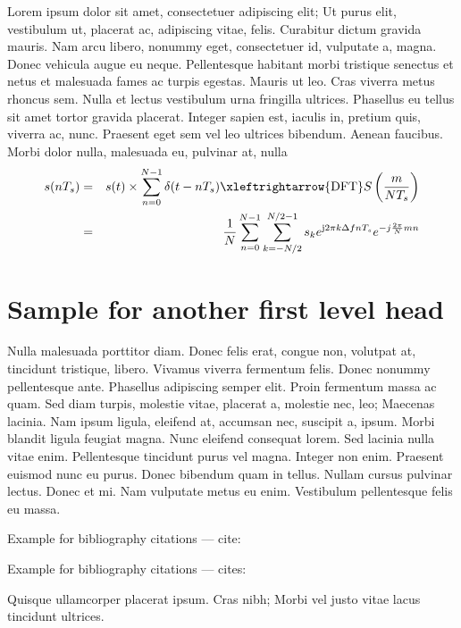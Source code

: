 \documentclass[CJCE,STIX2COL]{WileyNJD-v2}
\begin{document}
Lorem ipsum dolor sit amet, consectetuer adipiscing elit\cite{ennis1994}; Ut purus elit, vestibulum ut, placerat ac, adipiscing vitae, felis. Curabitur dictum gravida mauris. Nam arcu libero, nonummy eget, consectetuer id, vulputate a, magna. Donec vehicula augue eu neque. Pellentesque habitant morbi tristique senectus et netus et malesuada fames ac turpis egestas.  Mauris ut leo. Cras viverra metus rhoncus sem. Nulla et lectus vestibulum urna fringilla ultrices. Phasellus eu tellus sit amet tortor gravida placerat. Integer sapien est, iaculis in, pretium quis, viverra ac, nunc. Praesent eget sem vel leo ultrices bibendum. Aenean faucibus. Morbi dolor nulla, malesuada eu, pulvinar at, nulla
\begin{eqnarray}
s(nT_{s}) &= &s(t)\times \sum\limits_{n=0}^{N-1} \delta (t-nT_{s}) \xleftrightarrow{\mathrm{DFT}}  S \left(\frac{m}{NT_{s}}\right) \nonumber\\
&= &\frac{1}{N} \sum\limits_{n=0}^{N-1} \sum\limits_{k=-N/2}^{N/2-1} s_{k} e^{\mathrm{j}2\pi k\Delta fnT_{s}} e^{-j\frac{2\pi}{N}mn}
\end{eqnarray}

\section{Sample for another first level head}\label{sec2}

Nulla malesuada porttitor diam. Donec felis erat, congue non, volutpat at, tincidunt tristique, libero. Vivamus viverra
fermentum felis. Donec nonummy pellentesque ante. Phasellus adipiscing semper elit. Proin fermentum massa ac
quam. Sed diam turpis, molestie vitae, placerat a, molestie nec, leo\cite{ennis1994}; Maecenas lacinia. Nam ipsum ligula, eleifend
at, accumsan nec, suscipit a, ipsum. Morbi blandit ligula feugiat magna. Nunc eleifend consequat lorem. Sed lacinia
nulla vitae enim. Pellentesque tincidunt purus vel magna. Integer non enim. Praesent euismod nunc eu purus. Donec
bibendum quam in tellus. Nullam cursus pulvinar lectus. Donec et mi. Nam vulputate metus eu enim. Vestibulum
pellentesque felis eu massa.

Example for bibliography citations --- cite\cite{Vidal2009}:

Example for bibliography citations --- cites\cite{Vidal2009,Allen2011}:

Quisque ullamcorper placerat ipsum. Cras nibh\cite{Ballen2011,Schulz2012}; Morbi vel justo vitae lacus tincidunt ultrices. 

\end{document}
